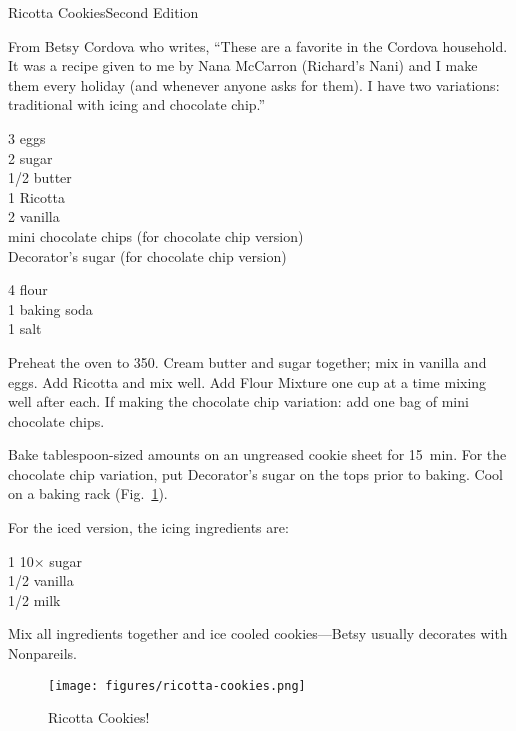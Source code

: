 \begin{entry}{Ricotta Cookies}{Second Edition}

\begin{open}
    From Betsy Cordova who writes, ``These are a favorite in the Cordova household. It was a recipe given to me by Nana McCarron (Richard's Nani) and I make them every holiday (and whenever anyone asks for them). I have two variations: traditional with icing and chocolate chip.''
\end{open}
\begin{ingredients}
    3 eggs\\
    \SI{2}{\cup} sugar\\
    \SI{1/2}{\pound} butter\\
    \SI{1}{\pound} Ricotta\\
    \SI{2}{\teaspoon} vanilla\\
    mini chocolate chips (for chocolate chip version)\\
    Decorator's sugar (for chocolate chip version)
\end{ingredients}
\begin{ingredients}
    \SI{4}{\cup} flour\\
    \SI{1}{\teaspoon} baking soda\\
    \SI{1}{\teaspoon} salt
\end{ingredients}
Preheat the oven to \SI{350}{\degreeF}.  Cream butter and sugar together; mix in
vanilla and eggs. Add Ricotta and mix well. Add Flour Mixture one cup at a time
mixing well after each. If making the chocolate chip variation: add one bag
of mini chocolate chips.

Bake tablespoon-sized amounts on an ungreased cookie sheet for \SI{15}{\minute}.
For the chocolate chip variation, put Decorator's sugar on the tops prior to
baking. Cool on a baking rack (Fig.~\ref{fig:ricotta-cookies}).

For the iced version, the icing ingredients are:
\begin{ingredients}
    \SI{1}{\cup} 10$\boldsymbol\times$ sugar\\
    \SI{1/2}{\teaspoon} vanilla\\
    \SI{1/2}{\cup} milk
\end{ingredients}
Mix all ingredients together and ice cooled cookies---Betsy usually decorates with Nonpareils.
\begin{figure}
    \centering
    \texttt{[image: figures/ricotta-cookies.png]}
    \caption{Ricotta Cookies!}
    \label{fig:ricotta-cookies}
\end{figure}

\end{entry}


